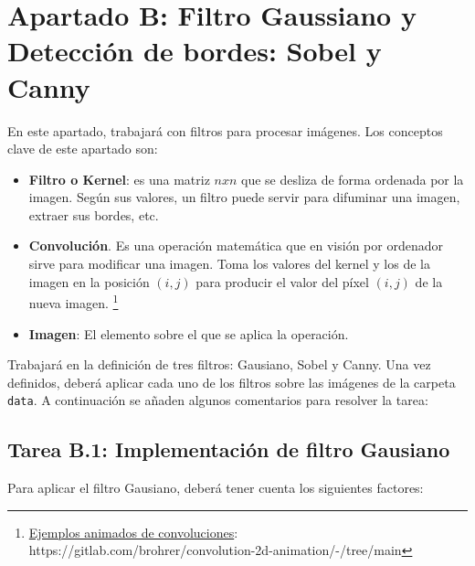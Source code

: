 \chapter{Apartado B: \textbf{Filtro Gaussiano y Detección de bordes: Sobel y Canny}}
\label{chapter:tarea_b}

En este apartado, trabajará con filtros para procesar imágenes. Los conceptos clave de este apartado son:

\begin{itemize}
    \item \textbf{Filtro o Kernel}: es una matriz $n x n$ que se desliza de forma ordenada por la imagen. Según sus valores, un filtro puede servir para difuminar una imagen, extraer sus bordes, etc.
    \item \textbf{Convolución}. Es una operación matemática que en visión por ordenador sirve para modificar una imagen. Toma los valores del kernel y los de la imagen en la posición $(i, j)$ para producir el valor del píxel $(i, j)$ de la nueva imagen. \footnote{\href{https://gitlab.com/brohrer/convolution-2d-animation/-/tree/main}{Ejemplos animados de convoluciones}: https://gitlab.com/brohrer/convolution-2d-animation/-/tree/main}
    \item \textbf{Imagen}: El elemento sobre el que se aplica la operación.
\end{itemize}

Trabajará en la definición de tres filtros: Gausiano, Sobel y Canny. Una vez definidos, deberá aplicar cada uno de los filtros sobre las imágenes de la carpeta \texttt{data}. A continuación se añaden algunos comentarios para resolver la tarea:

\section*{Tarea B.1: Implementación de filtro Gausiano}
{}

Para aplicar el filtro Gausiano, deberá tener cuenta los siguientes factores:

